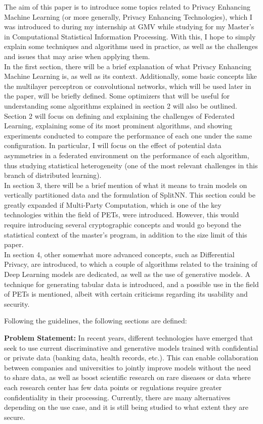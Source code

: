 \documentclass[oneside, openany]{book}
\begin{document}

\small{
The aim of this paper is to introduce some topics related to Privacy Enhancing Machine Learning (or more generally, Privacy Enhancing Technologies), which I was introduced to during my internship at GMV while studying for my Master’s in Computational Statistical Information Processing. With this, I hope to simply explain some techniques and algorithms used in practice, as well as the challenges and issues that may arise when applying them.\\
In the first section, there will be a brief explanation of what Privacy Enhancing Machine Learning is, as well as its context. Additionally, some basic concepts like the multilayer perceptron or convolutional networks, which will be used later in the paper, will be briefly defined. Some optimizers that will be useful for understanding some algorithms explained in section 2 will also be outlined.\\
Section 2 will focus on defining and explaining the challenges of Federated Learning, explaining some of its most prominent algorithms, and showing experiments conducted to compare the performance of each one under the same configuration. In particular, I will focus on the effect of potential data asymmetries in a federated environment on the performance of each algorithm, thus studying statistical heterogeneity (one of the most relevant challenges in this branch of distributed learning).\\
In section 3, there will be a brief mention of what it means to train models on vertically partitioned data and the formulation of SplitNN. This section could be greatly expanded if Multi-Party Computation, which is one of the key technologies within the field of PETs, were introduced. However, this would require introducing several cryptographic concepts and would go beyond the statistical context of the master’s program, in addition to the size limit of this paper.\\
In section 4, other somewhat more advanced concepts, such as Differential Privacy, are introduced, to which a couple of algorithms related to the training of Deep Learning models are dedicated, as well as the use of generative models. A technique for generating tabular data is introduced, and a possible use in the field of PETs is mentioned, albeit with certain criticisms regarding its usability and security.

Following the guidelines, the following sections are defined:

\textbf{Problem Statement:} In recent years, different technologies have emerged that seek to use current discriminative and generative models trained with confidential or private data (banking data, health records, etc.). This can enable collaboration between companies and universities to jointly improve models without the need to share data, as well as boost scientific research on rare diseases or data where each research center has few data points or regulations require greater confidentiality in their processing. Currently, there are many alternatives depending on the use case, and it is still being studied to what extent they are secure.

}
\end{document}
